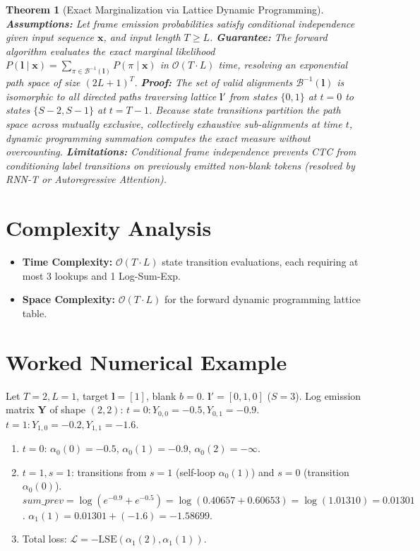 \documentclass[11pt]{article}
\newtheorem{theorem}{Theorem}
\begin{document}
\begin{theorem}[Exact Marginalization via Lattice Dynamic Programming]
\label{thm:ctc_polynomial_exactness}
\textbf{Assumptions:} Let frame emission probabilities satisfy conditional independence given input sequence $\mathbf{x}$, and input length $T \ge L$.
\textbf{Guarantee:} The forward algorithm evaluates the exact marginal likelihood $P(\mathbf{l} \mid \mathbf{x}) = \sum_{\pi \in \mathcal{B}^{-1}(\mathbf{l})} P(\pi \mid \mathbf{x})$ in $\mathcal{O}(T \cdot L)$ time, resolving an exponential path space of size $(2L+1)^T$.
\textbf{Proof:}
The set of valid alignments $\mathcal{B}^{-1}(\mathbf{l})$ is isomorphic to all directed paths traversing lattice $\mathbf{l}'$ from states $\{0, 1\}$ at $t=0$ to states $\{S-2, S-1\}$ at $t=T-1$. Because state transitions partition the path space across mutually exclusive, collectively exhaustive sub-alignments at time $t$, dynamic programming summation computes the exact measure without overcounting.
\textbf{Limitations:} Conditional frame independence prevents CTC from conditioning label transitions on previously emitted non-blank tokens (resolved by RNN-T or Autoregressive Attention).
\end{theorem}

\section{Complexity Analysis}
\label{sec:complexity}

\begin{itemize}
    \item \textbf{Time Complexity:} $\mathcal{O}(T \cdot L)$ state transition evaluations, each requiring at most 3 lookups and 1 Log-Sum-Exp.
    \item \textbf{Space Complexity:} $\mathcal{O}(T \cdot L)$ for the forward dynamic programming lattice table.
\end{itemize}

\section{Worked Numerical Example}
\label{sec:worked_example}

Let $T = 2, L = 1$, target $\mathbf{l} = [1]$, blank $b = 0$. $\mathbf{l}' = [0, 1, 0]$ ($S = 3$).
Log emission matrix $\mathbf{Y}$ of shape $(2, 2)$:
$t = 0: Y_{0, 0} = -0.5, Y_{0, 1} = -0.9$.
$t = 1: Y_{1, 0} = -0.2, Y_{1, 1} = -1.6$.
\begin{enumerate}
    \item $t = 0$: $\alpha_0(0) = -0.5$, $\alpha_0(1) = -0.9$, $\alpha_0(2) = -\infty$.
    \item $t = 1, s = 1$: transitions from $s=1$ (self-loop $\alpha_0(1)$) and $s=0$ (transition $\alpha_0(0)$).
    $sum\_prev = \log(e^{-0.9} + e^{-0.5}) = \log(0.40657 + 0.60653) = \log(1.01310) = 0.01301$.
    $\alpha_1(1) = 0.01301 + (-1.6) = -1.58699$.
    \item Total loss: $\mathcal{L} = -\mathrm{LSE}(\alpha_1(2), \alpha_1(1))$.
\end{enumerate}
\end{document}
